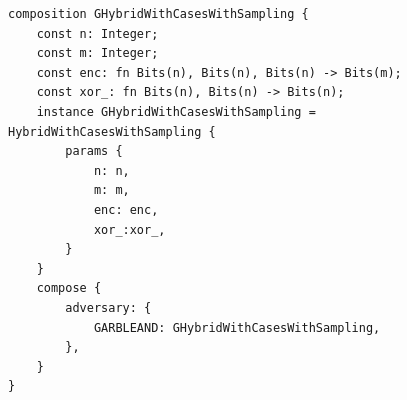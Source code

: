 \begin{longlisting}
\begin{verbatim}
composition GHybridWithCasesWithSampling {
    const n: Integer; 
    const m: Integer;  
    const enc: fn Bits(n), Bits(n), Bits(n) -> Bits(m); 
    const xor_: fn Bits(n), Bits(n) -> Bits(n);
    instance GHybridWithCasesWithSampling = HybridWithCasesWithSampling {
        params {
            n: n,
            m: m,
            enc: enc,
            xor_:xor_,
        }
    }
    compose {
        adversary: {
            GARBLEAND: GHybridWithCasesWithSampling,
        },
    }
}
\end{verbatim}
\caption{Composition }
\label{lst:domino-composition-ghybridwithcaseswithsampling}
\end{longlisting}